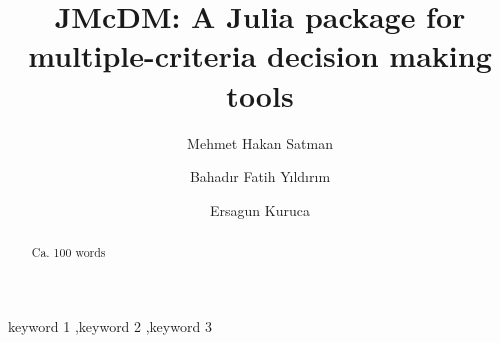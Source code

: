 \documentclass[authoryear,preprint,review,12pt]{elsarticle}
\begin{document}
\begin{frontmatter}



\title{JMcDM: A Julia package for multiple-criteria decision making tools}


\author[author1]{Mehmet Hakan Satman}
\author[author2]{Bahadır Fatih Yıldırım}
\author[author3]{Ersagun Kuruca}


\address[author1]{Istanbul University, Department of Econometrics, Beyazit, Istanbul, Turkey}
\address[author2]{Istanbul University, Department of Transportation and Logistics, Avcilar, Istanbul, Turkey}
\address[author3]{Istanbul Technical University, Department of Computer Engineering, Sariyer,  Istanbul, Turkey}





\begin{abstract}
Ca. 100 words

\end{abstract}

\begin{keyword}
keyword 1 \sep keyword 2 \sep keyword 3



\end{keyword}

\end{frontmatter}
\end{document}

